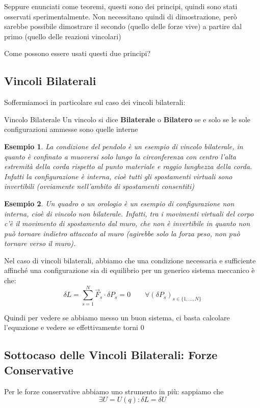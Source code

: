 \documentclass[11pt,a4paper,twoside]{article}
\newtheorem{es}{Esempio}
\theoremstyle{definition}
\begin{document}
Seppure enunciati come teoremi, questi sono dei principi, quindi sono stati osservati sperimentalmente. Non necessitano quindi di dimostrazione, però sarebbe possibile dimostrare il secondo (quello delle forze vive) a partire dal primo (quello delle reazioni vincolari)

Come possono essere usati questi due principi?

\subsection{Vincoli Bilaterali}

Soffermiamoci in particolare sul caso dei vincoli bilaterali:

\begin{defn}{Vincolo Bilaterale}{}
	Un vincolo si dice \textbf{Bilaterale} o \textbf{Bilatero} se e solo se le sole configurazioni ammesse sono quelle interne
\end{defn}

\begin{es}
	La condizione del pendolo è un esempio di vincolo bilaterale, in quanto è confinato a muoversi solo lungo la circonferenza con centro l'alta estremità della corda rispetto al punto materiale e raggio lunghezza della corda. Infatti la configurazione è interna, cioè tutti gli spostamenti virtuali sono invertibili (ovviamente nell'ambito di spostamenti consentiti)
\end{es}

\begin{es}
	Un quadro o un orologio è un esempio di configurazione non interna, cioè di vincolo non bilaterale. Infatti, tra i movimenti virtuali del corpo c'è il movimento di spostamento dal muro, che non è invertibile in quanto non può tornare indietro attaccato al muro (agirebbe solo la forza peso, non può tornare verso il muro).
\end{es}

\begin{prop}{}{}
	Nel caso di vincoli bilaterali, abbiamo che una condizione necessaria e sufficiente affinché una configurazione sia di equilibrio per un generico sistema meccanico è che:
	\[ \delta L = \sum_{s = 1}^N \vec F_s \cdot \delta P_s = 0\qquad \forall(\delta P_s)_{s \in \{1,...,N\}} \]
\end{prop}

Quindi per vedere se abbiamo messo un buon sistema, ci basta calcolare l'equazione e vedere se effettivamente torni 0

\subsection{Sottocaso delle Vincoli Bilaterali: Forze Conservative}
Per le forze conservative abbiamo uno strumento in più: sappiamo che
\[ \exists U=U(q) : \delta L = \delta U \]
\end{document}
